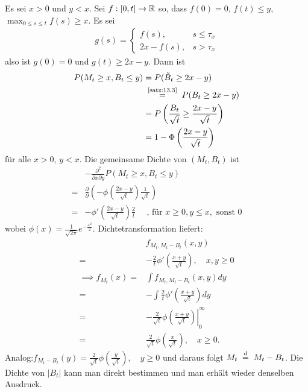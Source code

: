 \documentclass[a4paper,twoside,DIV15,BCOR12mm]{scrbook}
\begin{document}
\begin{beweis}
Es sei $x>0$ und $y<x$. Sei $f:[0,t]\to \mathbb{R}$ so, dass $f(0)=0$, $f(t)\le y$, $\max_{0\le s\le t}f(s) \ge x$. Es sei 
\begin{align*}
g(s) = 
\begin{cases}
f(s), &s\le \tau_x\\
2x-f(s), &s>\tau _x
\end{cases}
\end{align*}
also ist $g(0)=0$ und $g(t) \ge 2x-y$. Dann ist 
\begin{align*}
P(M_t\ge x, B_t\le y) &= P(\tilde B_t\ge 2x-y) \\
&\gleichnach{\ref{satz:13.3}} P(B_t\ge 2x-y) \\
&=P\left(\frac{B_t}{\sqrt{t}}\geq\frac{2x-y}{\sqrt{t}}\right) \\
&=1-\Phi\left(\frac{2x-y}{\sqrt{t}}\right)
\end{align*}
für alle $x>0$, $y<x$. Die gemeinsame Dichte von $(M_t,B_t)$ ist
\begin{align*}
 & -\frac{\partial^2}{\partial x\partial y}P(M_t\geq x,B_t\leq y) \\
=&\frac{\partial}{\partial}\left(-\phi\left(\frac{2x-y}{\sqrt{t}}\right)\frac{1}{\sqrt{t}}\right) \\
=&-\phi'\left(\frac{2x-y}{\sqrt{t}}\right)\frac{2}{t}\quad\text{ , für } x\geq0,y\leq x,\text{ sonst } 0
\end{align*}
wobei $\phi(x)=\frac{1}{\sqrt{2\pi}}e^{-\frac{x^2}{2}}$.
Dichtetransformation liefert:
\begin{align*}
  & f_{M_t,M_t-B_t}(x,y) \\
=&-\frac{2}{t}\phi'\left(\frac{x+y}{\sqrt{t}}\right),\quad x,y\geq0 \\
\implies f_{M_t}(x)=&\int f_{M_t,M_t-B_t}(x,y)dy \\
=&-\int\frac{2}{t}\phi'\left(\frac{x+y}{\sqrt{t}}\right)dy \\
=&-\frac{2}{\sqrt{t}}\phi\left.\left(\frac{x+y}{\sqrt{t}}\right)\right|_0^\infty\\
=&\frac{2}{\sqrt{t}}\phi\left(\frac{x}{\sqrt{t}}\right),\quad x\geq0.
\end{align*}
Analog:$f_{M_t-B_t}(y)=\frac{2}{\sqrt{t}}\phi\left(\frac{y}{\sqrt{t}}\right),\quad y\geq0$ und daraus folgt $M_t\gleichnach{d}M_t-B_t$.
Die Dichte von $\vert B_t\vert$ kann man direkt bestimmen und man erhält wieder denselben Ausdruck.
\end{beweis}
\end{document}
